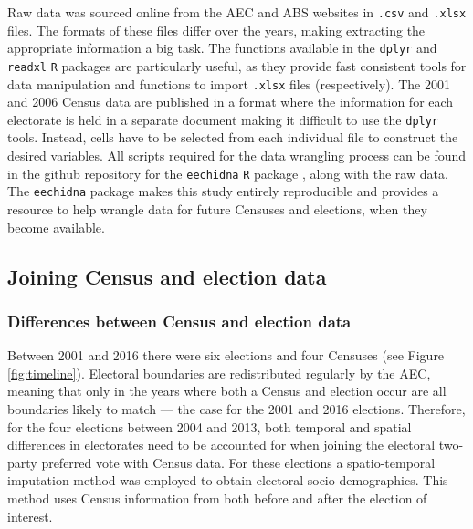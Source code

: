 \documentclass[times, doublespace]{anzsauth}
\begin{document}
Raw data was sourced online from the AEC and ABS websites in \texttt{.csv} and \texttt{.xlsx} files. The formats of these files differ over the years, making extracting the appropriate information a big task. The functions available in the \texttt{dplyr} \citep{dplyr} and \texttt{readxl} \citep{readxl} \texttt{R} packages are particularly useful, as they provide fast consistent tools for data manipulation and functions to import \texttt{.xlsx} files (respectively). The 2001 and 2006 Census data are published in a format where the information for each electorate is held in a separate document making it difficult to use the \texttt{dplyr} tools. Instead, cells have to be selected from each individual file to construct the desired variables. All scripts required for the data wrangling process can be found in the github repository for the \texttt{eechidna} \texttt{R} package \citep{eechidna}, along with the raw data. The \texttt{eechidna} package makes this study entirely reproducible and provides a resource to help wrangle data for future Censuses and elections, when they become available.

\hypertarget{joining-census-and-election-data}{%
\subsection{Joining Census and election data}\label{joining-census-and-election-data}}

\hypertarget{differences-between-census-and-election-data}{%
\subsubsection*{Differences between Census and election data}\label{differences-between-census-and-election-data}}

Between 2001 and 2016 there were six elections and four Censuses (see Figure \ref{fig:timeline}). Electoral boundaries are redistributed regularly by the AEC, meaning that only in the years where both a Census and election occur are all boundaries likely to match --- the case for the 2001 and 2016 elections. Therefore, for the four elections between 2004 and 2013, both temporal and spatial differences in electorates need to be accounted for when joining the electoral two-party preferred vote with Census data. For these elections a spatio-temporal imputation method was employed to obtain electoral socio-demographics. This method uses Census information from both before and after the election of interest.
\end{document}
